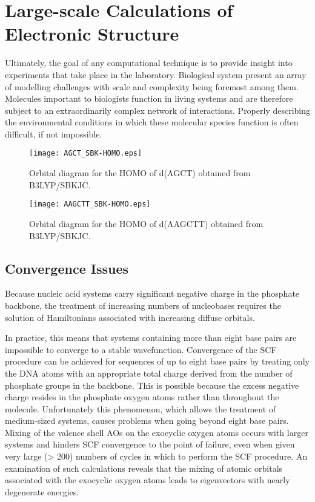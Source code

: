 \section{Large-scale Calculations of Electronic Structure}
Ultimately, the goal of any computational technique is to provide
insight into experiments that take place in the laboratory.
Biological system present an array of modelling challenges with scale
and complexity being foremost among them.  Molecules important to
biologists function in living systems and are therefore subject to an
extraordinarily complex network of interactions.  Properly describing
the environmental conditions in which these molecular species function
is often difficult, if not impossible.


\begin{figure}[tb]
\texttt{[image: AGCT\_SBK-HOMO.eps]}
\caption{Orbital diagram for the HOMO of d(AGCT) obtained from B3LYP/SBKJC.\label{Fig:AGCT_HOMO}}
\end{figure}

\begin{figure}[tb]
\texttt{[image: AAGCTT\_SBK-HOMO.eps]}
\caption{Orbital diagram for the HOMO of d(AAGCTT) obtained from B3LYP/SBKJC.\label{Fig:AAGCTT_HOMO}}
\end{figure}


\subsection{Convergence Issues}
Because nucleic acid systems carry significant negative charge in the
phosphate backbone, the treatment of increasing numbers of nucleobases
requires the solution of Hamiltonians associated with increasing
diffuse orbitals.

In practice, this means that systems containing more than eight base
pairs are impossible to converge to a stable wavefunction.
Convergence of the SCF procedure can be achieved for sequences of up
to eight base pairs by treating only the DNA atoms with an appropriate
total charge derived from the number of phosphate groups in the
backbone.  This is possible because the excess negative charge resides
in the phosphate oxygen atoms rather than throughout the molecule.
Unfortunately this phenomenon, which allows the treatment of
medium-sized systems, causes problems when going beyond eight base
pairs.  Mixing of the valence shell AOs on the exocyclic oxygen atoms
occurs with larger systems and hinders SCF convergence to the point of
failure, even when given very large (> 200) numbers of cycles in which
to perform the SCF procedure.  An examination of such calculations
reveals that the mixing of atomic orbitals associated with the
exocyclic oxygen atoms leads to eigenvectors with nearly degenerate
energies.

